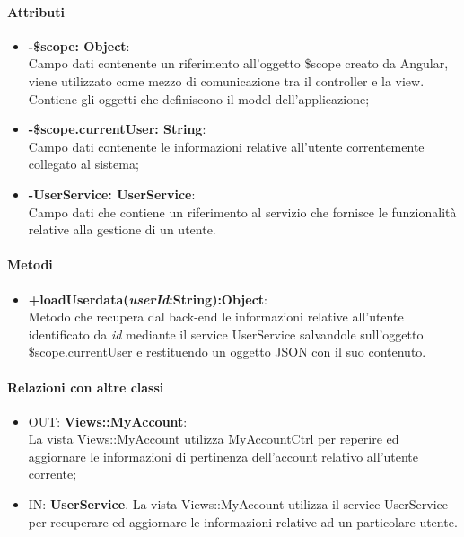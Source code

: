 \paragraph{Attributi}
\begin{itemize}
	\item \textbf{-\$scope: Object}:\\
	Campo dati contenente un riferimento all'oggetto \$scope creato da Angular, viene utilizzato come mezzo di comunicazione tra il controller e la view. Contiene gli oggetti che definiscono il model dell'applicazione;
	\item \textbf{-\$scope.currentUser: String}:\\
	Campo dati contenente le informazioni relative all'utente correntemente collegato al sistema;
	\item \textbf{-UserService: UserService}:\\
	Campo dati che contiene un riferimento al servizio che fornisce le funzionalità relative alla gestione di un utente.
\end{itemize}

\paragraph{Metodi}
\begin{itemize}
	\item \textbf{+loadUserdata(\textit{userId}:String):Object}:\\
	Metodo che recupera dal back-end le informazioni relative all'utente identificato da \textit{id} mediante il service UserService salvandole sull'oggetto \$scope.currentUser e restituendo un oggetto JSON con il suo contenuto.
\end{itemize}
\paragraph{Relazioni con altre classi}
\begin{itemize}
	\item OUT: \textbf{Views::MyAccount}:\\
	La vista Views::MyAccount utilizza MyAccountCtrl per reperire ed aggiornare le informazioni di pertinenza dell'account relativo all'utente corrente;
	\item IN: \textbf{UserService}.
	La vista Views::MyAccount utilizza il service UserService per recuperare ed aggiornare le informazioni relative ad un particolare utente.
	
\end{itemize}

